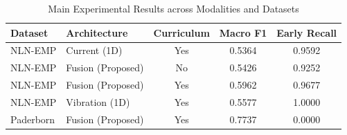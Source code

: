 \begin{table}[h]
\centering
\caption{Main Experimental Results across Modalities and Datasets}
\label{tab:main_results}
\begin{tabular}{llccc}
\hline
\textbf{Dataset} & \textbf{Architecture} & \textbf{Curriculum} & \textbf{Macro F1} & \textbf{Early Recall} \\
\hline
NLN-EMP & Current (1D) & Yes & 0.5364 & 0.9592 \\
NLN-EMP & Fusion (Proposed) & No & 0.5426 & 0.9252 \\
NLN-EMP & Fusion (Proposed) & Yes & 0.5962 & 0.9677 \\
NLN-EMP & Vibration (1D) & Yes & 0.5577 & 1.0000 \\
Paderborn & Fusion (Proposed) & Yes & 0.7737 & 0.0000 \\
\hline
\end{tabular}
\end{table}
